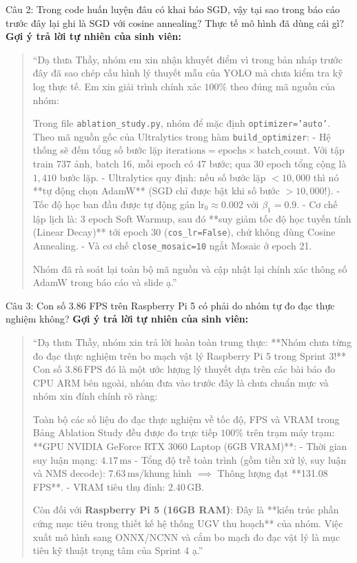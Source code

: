 \documentclass[11pt,a4paper]{article}
\begin{document}
\begin{ansbox}{Câu 2: Trong code huấn luyện đâu có khai báo SGD, vậy tại sao trong báo cáo trước đây lại ghi là SGD với cosine annealing? Thực tế mô hình đã dùng cái gì?}
\textbf{Gợi ý trả lời tự nhiên của sinh viên:}
\begin{quote}
``Dạ thưa Thầy, nhóm em xin nhận khuyết điểm vì trong bản nháp trước đây đã sao chép cấu hình lý thuyết mẫu của YOLO mà chưa kiểm tra kỹ log thực tế. Em xin giải trình chính xác $100\%$ theo đúng mã nguồn của nhóm:

Trong file \texttt{ablation\_study.py}, nhóm để mặc định \texttt{optimizer='auto'}.
Theo mã nguồn gốc của Ultralytics trong hàm \texttt{build\_optimizer}:
- Hệ thống sẽ đếm tổng số bước lặp $\text{iterations} = \text{epochs} \times \text{batch\_count}$. Với tập train $737$ ảnh, batch 16, mỗi epoch có 47 bước; qua 30 epoch tổng cộng là $1,410$ bước lặp.
- Ultralytics quy định: nếu số bước lặp $< 10,000$ thì nó **tự động chọn AdamW** (SGD chỉ được bật khi số bước $> 10,000$!).
- Tốc độ học ban đầu được tự động gán $\text{lr}_0 \approx 0.002$ với $\beta_1 = 0.9$.
- Cơ chế lập lịch là: 3 epoch Soft Warmup, sau đó **suy giảm tốc độ học tuyến tính (Linear Decay)** tới epoch 30 (\texttt{cos\_lr=False}), chứ không dùng Cosine Annealing.
- Và cơ chế \texttt{close\_mosaic=10} ngắt Mosaic ở epoch 21.

Nhóm đã rà soát lại toàn bộ mã nguồn và cập nhật lại chính xác thông số AdamW trong báo cáo và slide ạ.''
\end{quote}
\end{ansbox}

\vspace{6pt}

\begin{ansbox}{Câu 3: Con số 3.86 FPS trên Raspberry Pi 5 có phải do nhóm tự đo đạc thực nghiệm không?}
\textbf{Gợi ý trả lời tự nhiên của sinh viên:}
\begin{quote}
``Dạ thưa Thầy, nhóm xin trả lời hoàn toàn trung thực: **Nhóm chưa từng đo đạc thực nghiệm trên bo mạch vật lý Raspberry Pi 5 trong Sprint 3!** Con số $3.86\,\text{FPS}$ đó là một ước lượng lý thuyết dựa trên các bài báo đo CPU ARM bên ngoài, nhóm đưa vào trước đây là chưa chuẩn mực và nhóm xin đính chính rõ ràng:

Toàn bộ các số liệu đo đạc thực nghiệm về tốc độ, FPS và VRAM trong Bảng Ablation Study đều được đo trực tiếp $100\%$ trên trạm máy trạm: **GPU NVIDIA GeForce RTX 3060 Laptop (6GB VRAM)**:
- Thời gian suy luận mạng: $4.17\,\text{ms}$
- Tổng độ trễ toàn trình (gồm tiền xử lý, suy luận và NMS decode): $7.63\,\text{ms}$/khung hình $\implies$ Thông lượng đạt **131.08 FPS**.
- VRAM tiêu thụ đỉnh: $2.40\,\text{GB}$.

Còn đối với \textbf{Raspberry Pi 5 (16GB RAM)}: Đây là **kiến trúc phần cứng mục tiêu trong thiết kế hệ thống UGV thu hoạch** của nhóm. Việc xuất mô hình sang ONNX/NCNN và cắm bo mạch đo đạc vật lý là mục tiêu kỹ thuật trọng tâm của Sprint 4 ạ.''
\end{quote}
\end{ansbox}
\end{document}
